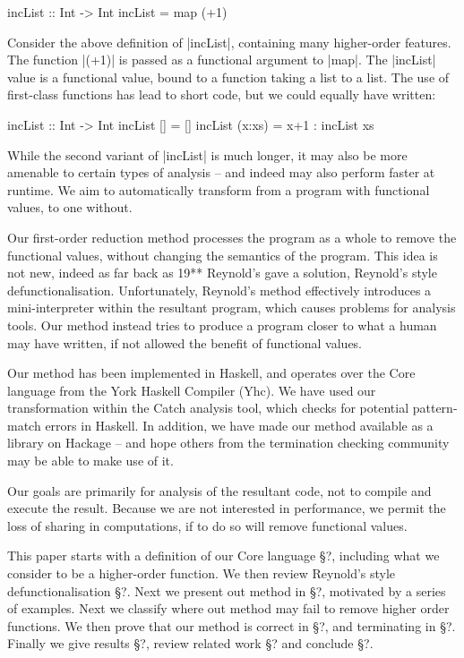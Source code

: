 \documentclass[preprint]{sigplanconf}
\begin{document}
\begin{example}
\begin{code}
incList :: Int -> Int
incList = map (+1)
\end{code}

Consider the above definition of |incList|, containing many higher-order features. The function |(+1)| is passed as a functional argument to |map|. The |incList| value is a functional value, bound to a function taking a list to a list. The use of first-class functions has lead to short code, but we could equally have written:

\begin{code}
incList :: Int -> Int
incList []      = []
incList (x:xs)  = x+1 : incList xs
\end{code}

While the second variant of |incList| is much longer, it may also be more amenable to certain types of analysis -- and indeed may also perform faster at runtime. We aim to automatically transform from a program with functional values, to one without.
\end{example}

Our first-order reduction method processes the program as a whole to remove the functional values, without changing the semantics of the program. This idea is not new, indeed as far back as 19** Reynold's gave a solution, Reynold's style defunctionalisation. Unfortunately, Reynold's method effectively introduces a mini-interpreter within the resultant program, which causes problems for analysis tools. Our method instead tries to produce a program closer to what a human may have written, if not allowed the benefit of functional values.

Our method has been implemented in Haskell, and operates over the Core language from the York Haskell Compiler (Yhc). We have used our transformation within the Catch analysis tool, which checks for potential pattern-match errors in Haskell. In addition, we have made our method available as a library on Hackage -- and hope others from the termination checking community may be able to make use of it.

Our goals are primarily for analysis of the resultant code, not to compile and execute the result. Because we are not interested in performance, we permit the loss of sharing in computations, if to do so will remove functional values.

This paper starts with a definition of our Core language \S?, including what we consider to be a higher-order function. We then review Reynold's style defunctionalisation \S?. Next we present out method in \S?, motivated by a series of examples. Next we classify where out method may fail to remove higher order functions. We then prove that our method is correct in \S?, and terminating in \S?. Finally we give results \S?, review related work \S? and conclude \S?.
\end{document}
